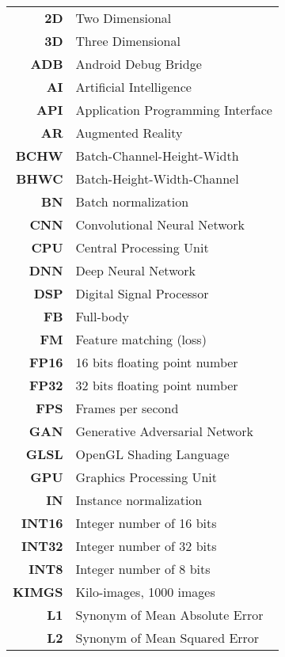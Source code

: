\begin{changemargin}{-1.5cm}{0cm}
\begin{tabular}{@{}>{\bf}r l}
	2D & Two Dimensional \\
	3D & Three Dimensional \\
	ADB & Android Debug Bridge \\
	AI & Artificial Intelligence \\
	API & Application Programming Interface \\
	AR & Augmented Reality \\
	BCHW & Batch-Channel-Height-Width \\
	BHWC & Batch-Height-Width-Channel \\
	BN & Batch normalization \\
	CNN & Convolutional Neural Network \\
	CPU & Central Processing Unit \\
	DNN & Deep Neural Network \\
	DSP & Digital Signal Processor \\
	FB & Full-body \\
	FM & Feature matching (loss) \\
	FP16 & 16 bits floating point number \\
	FP32 & 32 bits floating point number \\
	FPS & Frames per second\\
	GAN & Generative Adversarial Network \\
	GLSL & OpenGL Shading Language \\
	GPU & Graphics Processing Unit \\
	IN & Instance normalization \\
	INT16 & Integer number of 16 bits \\
	INT32 & Integer number of 32 bits \\
	INT8 & Integer number of 8 bits \\
	KIMGS & Kilo-images, 1000 images \\
	L1 & Synonym of Mean Absolute Error \\
	L2 & Synonym of Mean Squared Error \\	
\end{tabular}
\hspace{-1em}
\begin{tabular}{>{\bf}r l@{}}

\end{tabular}
\end{changemargin}
